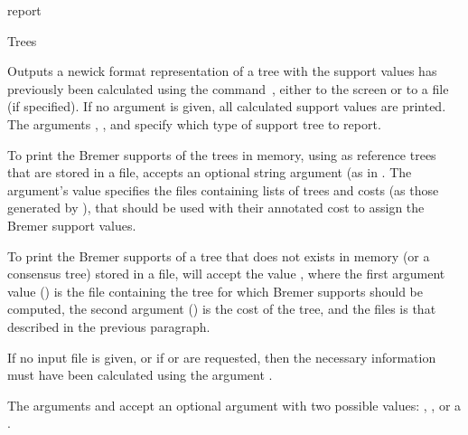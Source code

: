 \begin{command}{report}{}
\begin{arguments}
\begin{argumentgroup}{Trees}
                {Outputs a newick format representation of a tree with the
                support values has previously been calculated using the
                command~,
                either to the screen or to a file (if specified). If no argument
                is given, all calculated support values are printed. The arguments
                , , and
                 specify which type of support tree to
                report. 
                
                \setlength{\parindent}{0.5cm}                                
                \indent 
                To print the Bremer supports of the trees in memory, using as
                reference trees that are stored in a file,  accepts
                an optional string argument (as in .
                The argument's value specifies the files containing lists of
                trees and costs (as those generated by ), that
                should be used with their annotated cost to assign the Bremer
                support values.  

                \setlength{\parindent}{0.5cm}                                
                \indent 
                To print the Bremer supports of a tree that does not exists in
                memory (or a consensus tree) stored in a file,
                 will accept the value
                , where the
                first argument value (\poystring) is the file containing the tree for which
                Bremer supports should be computed, the second argument (\poyint) is the
                cost of the tree, and the files is that described in the
                previous paragraph.

                If no input file is given, or if  or
                 are requested, then the necessary
                information must have been calculated using the argument 
                .
                
               The arguments  and  accept an
                optional argument with two possible values:
                , , or a
                \poystring.

}
\end{argumentgroup}
\end{arguments}
\end{command}
